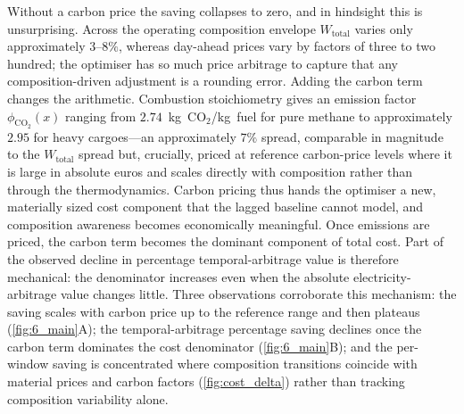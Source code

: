 \documentclass[11pt]{article}
\begin{document}
Without a carbon price the saving collapses to zero, and in hindsight this is
unsurprising. Across the operating composition envelope $W_{\text{total}}$
varies only approximately $3$--$8\%$, whereas day-ahead prices vary by factors of three
to two hundred; the optimiser has so much price arbitrage to capture that any
composition-driven adjustment is a rounding error. Adding the carbon term
changes the arithmetic. Combustion stoichiometry gives an emission factor
$\phi_{\text{CO}_2}(x)$ ranging from $2.74$~kg~CO$_2$/kg~fuel for pure
methane to approximately $2.95$ for heavy cargoes---an approximately $7\%$ spread,
comparable in magnitude to the $W_{\text{total}}$ spread but, crucially,
priced at reference carbon-price levels where it is large in absolute euros and scales
directly with composition rather than through the thermodynamics. Carbon
pricing thus hands the optimiser a new, materially sized cost component that
the lagged baseline cannot model, and composition awareness becomes
economically meaningful. Once emissions are priced, the carbon term becomes
the dominant component of total cost. Part of the observed decline in
percentage temporal-arbitrage value is therefore mechanical: the denominator
increases even when the absolute electricity-arbitrage value changes little.
Three observations corroborate this mechanism: the saving scales with carbon
price up to the reference range and then plateaus (\cref{fig:6_main}A); the
temporal-arbitrage percentage saving declines once the carbon term dominates
the cost denominator (\cref{fig:6_main}B); and the per-window saving is
concentrated where composition transitions coincide with material prices and
carbon factors (\cref{fig:cost_delta}) rather than tracking composition
variability alone.
\end{document}
